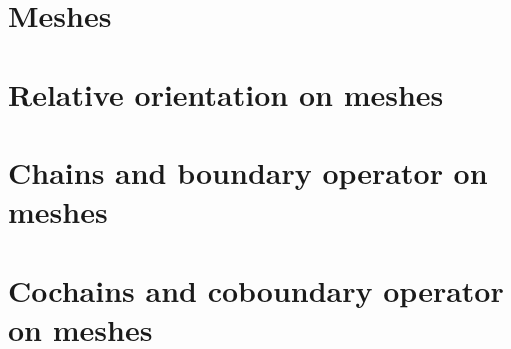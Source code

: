 \documentclass{article}
\theoremstyle{definition}
\begin{document}
\section{Meshes}
\label{section:meshes}


\section{Relative orientation on meshes}
\label{section:relative_orientation_on_meshes}





\section{Chains and boundary operator on meshes}
\label{section:chains_and_boundary_operator_on_meshes}








\section{Cochains and coboundary operator on meshes}
\label{section:cochains_and_coboundary_operator_on_meshes}




\end{document}
